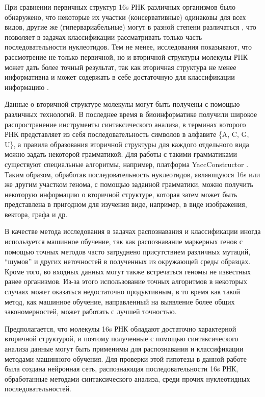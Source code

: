 \documentclass[14pt]{matmex-diploma}
\begin{document}
При сравнении первичных структур 16s РНК различных организмов было обнаружено, что некоторые их участки (консервативные) одинаковы для всех видов, другие же (гипервариабельные) могут в разной степени различаться \cite{3}, что позволяет в задачах классификации рассматривать только часть последовательности нуклеотидов. Тем не менее, исследования показывают, что рассмотрение не только первичной, но и вторичной структуры молекулы РНК может дать более точный результат, так как вторичная структура не менее информативна и может содержать в себе достаточную для классификации информацию \cite{4}.

Данные о вторичной структуре молекулы могут быть получены с помощью различных технологий. В последнее время в биоинформатике получили широкое распространение инструменты синтаксического анализа, в терминах которого РНК представляет из себя последовательность символов в алфавите \{A, C, G, U\}, а правила образования вторичной структуры для каждого отдельного вида можно задать некоторой грамматикой. Для работы с такими грамматиками существуют специальные алгоритмы, например, платформа YaccConstructor \cite{15}. Таким образом, обработав последовательность нуклеотидов, являющуюся 16s или же другим участком генома, с помощью заданной грамматики, можно получить некоторую информацию о вторичной структуре, которая затем может быть представлена в пригодном для изучения виде, например, в виде изображения, вектора, графа и др. 

В качестве метода исследования в задачах распознавания и классификации иногда используется машинное обучение, так как распознавание маркерных генов с помощью точных методов часто затруднено присутствием различных мутаций, “шумов” и других неточностей в полученных из окружающей среды образцах. Кроме того, во входных данных могут также встречаться геномы не известных ранее организмов. Из-за этого использование точных алгоритмов в некоторых случаях может оказаться недостаточно продуктивным, в то время как такой метод, как машинное обучение, направленный на выявление более общих закономерностей, может работать с лучшей точностью. 

Предполагается, что молекулы 16s РНК обладают достаточно характерной вторичной структурой, и поэтому полученные с помощью синтаксического анализа данные могут быть применимы для распознавания и классификации методами машинного обучения. Для проверки этой гипотезы в данной работе была создана нейронная сеть, распознающая последовательности 16s РНК, обработанные методами синтаксического анализа, среди прочих нуклеотидных последовательностей.
\end{document}

